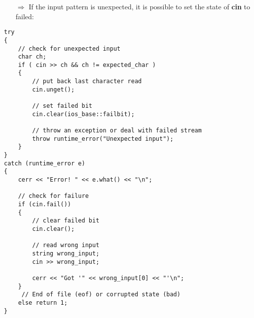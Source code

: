 \documentclass[10pt]{article}
\begin{document}
\begin{enumerate}
\item[$\Rightarrow$] If the input pattern is unexpected, it is possible to set the state of \textbf{cin} to failed:
\end{enumerate}
\begin{lstlisting}
try
{
    // check for unexpected input
    char ch;
    if ( cin >> ch && ch != expected_char )
    {
        // put back last character read
        cin.unget();
        
        // set failed bit
        cin.clear(ios_base::failbit);
    
        // throw an exception or deal with failed stream
        throw runtime_error("Unexpected input");
    }
}
catch (runtime_error e)
{
    cerr << "Error! " << e.what() << "\n";
            
    // check for failure
    if (cin.fail())
    {
        // clear failed bit
        cin.clear();
                
        // read wrong input
        string wrong_input;
        cin >> wrong_input;
                    
        cerr << "Got '" << wrong_input[0] << "'\n";
    }
     // End of file (eof) or corrupted state (bad)
    else return 1;
}
\end{lstlisting}
%
%
\end{document}
